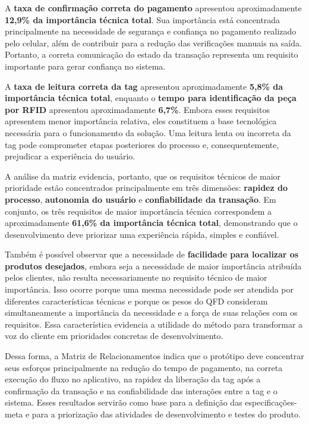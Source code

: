 A \textbf{taxa de confirmação correta do pagamento} apresentou aproximadamente \textbf{12,9\% da importância técnica total}. Sua importância está concentrada principalmente na necessidade de segurança e confiança no pagamento realizado pelo celular, além de contribuir para a redução das verificações manuais na saída. Portanto, a correta comunicação do estado da transação representa um requisito importante para gerar confiança no sistema.

A \textbf{taxa de leitura correta da tag} apresentou aproximadamente \textbf{5,8\% da importância técnica total}, enquanto o \textbf{tempo para identificação da peça por RFID} apresentou aproximadamente \textbf{6,7\%}. Embora esses requisitos apresentem menor importância relativa, eles constituem a base tecnológica necessária para o funcionamento da solução. Uma leitura lenta ou incorreta da tag pode comprometer etapas posteriores do processo e, consequentemente, prejudicar a experiência do usuário.

A análise da matriz evidencia, portanto, que os requisitos técnicos de maior prioridade estão concentrados principalmente em três dimensões: \textbf{rapidez do processo}, \textbf{autonomia do usuário} e \textbf{confiabilidade da transação}. Em conjunto, os três requisitos de maior importância técnica correspondem a aproximadamente \textbf{61,6\% da importância técnica total}, demonstrando que o desenvolvimento deve priorizar uma experiência rápida, simples e confiável.

Também é possível observar que a necessidade de \textbf{facilidade para localizar os produtos desejados}, embora seja a necessidade de maior importância atribuída pelos clientes, não resulta necessariamente no requisito técnico de maior importância. Isso ocorre porque uma mesma necessidade pode ser atendida por diferentes características técnicas e porque os pesos do QFD consideram simultaneamente a importância da necessidade e a força de suas relações com os requisitos. Essa característica evidencia a utilidade do método para transformar a voz do cliente em prioridades concretas de desenvolvimento.

Dessa forma, a Matriz de Relacionamentos indica que o protótipo deve concentrar seus esforços principalmente na redução do tempo de pagamento, na correta execução do fluxo no aplicativo, na rapidez da liberação da tag após a confirmação da transação e na confiabilidade das interações entre a tag e o sistema. Esses resultados servirão como base para a definição das especificações-meta e para a priorização das atividades de desenvolvimento e testes do produto.
